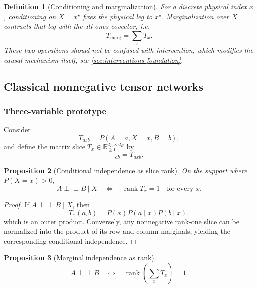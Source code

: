 \documentclass[11pt]{article}
\newtheorem{definition}{Definition}[section]
\newtheorem{proposition}[definition]{Proposition}
\theoremstyle{remark}
\newcommand{\indep}{\perp\!\!\!\perp}
\newcommand{\rank}{\operatorname{rank}}
\newcommand{\bbR}{\mathbb R}
\begin{document}
\begin{definition}[Conditioning and marginalization]
For a discrete physical index $x$, conditioning on $X=x^\star$ fixes the physical leg to $x^\star$. Marginalization over $X$ contracts that leg with the all-ones covector, i.e.
\begin{equation}
T_{\mathrm{marg}}=\sum_x T_x.
\end{equation}
These two operations should not be confused with intervention, which modifies the causal mechanism itself; see \cref{sec:interventions-foundation}.
\end{definition}

\subsection{Classical nonnegative tensor networks}
\label{sec:classical}

\subsubsection{Three-variable prototype}

Consider
\begin{equation}
T_{axb}=P(A=a,X=x,B=b),
\end{equation}
and define the matrix slice $T_x\in\bbR_{\ge0}^{d_A\times d_B}$ by
\begin{equation}
[T_x]_{ab}=T_{axb}.
\end{equation}

\begin{proposition}[Conditional independence as slice rank]
\label{prop:classical-slice-rank}
On the support where $P(X=x)>0$,
\begin{equation}
A\indep B\mid X
\quad\Longleftrightarrow\quad
\rank T_x=1\quad\text{for every }x.
\end{equation}
\end{proposition}
\begin{proof}
If $A\indep B\mid X$, then
\begin{equation}
T_x(a,b)=P(x)P(a\mid x)P(b\mid x),
\end{equation}
which is an outer product. Conversely, any nonnegative rank-one slice can be normalized into the product of its row and column marginals, yielding the corresponding conditional independence.
\end{proof}

\begin{proposition}[Marginal independence as rank]
\label{prop:classical-marginal-rank}
\begin{equation}
A\indep B
\quad\Longleftrightarrow\quad
\rank\!\left(\sum_x T_x\right)=1.
\end{equation}
\end{proposition}
\end{document}
